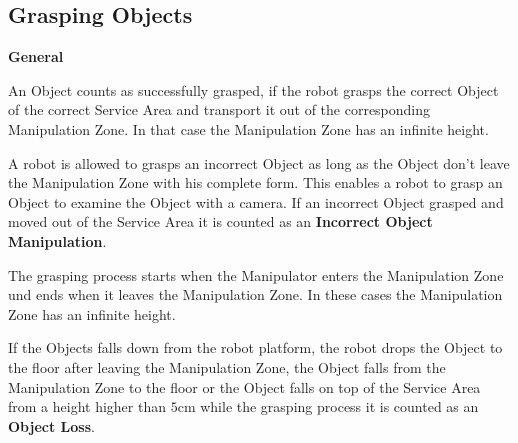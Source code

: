





\subsection{Grasping Objects} \label{ssec:GraspingObjects}

\textbf{General}

An Object counts as successfully grasped, if the robot grasps the correct Object of the correct Service Area and transport it out of the corresponding Manipulation Zone. In that case the Manipulation Zone has an infinite height. 

A robot is allowed to grasps an incorrect Object as long as the Object don't leave the Manipulation Zone with his complete form. This enables a robot to grasp an Object to examine the Object with a camera. If an incorrect Object grasped and moved out of the Service Area it is counted as an \textbf{Incorrect Object Manipulation}.

The grasping process starts when the Manipulator enters the Manipulation Zone und ends when it leaves the Manipulation Zone. In these cases the Manipulation Zone has an infinite height.

If the Objects falls down from the robot platform, the robot drops the Object to the floor after leaving the Manipulation Zone, the Object falls from the Manipulation Zone to the floor or the Object falls on top of the Service Area from a height higher than $5\si{\centi\meter}$ while the grasping process it is counted as an \textbf{Object Loss}.

